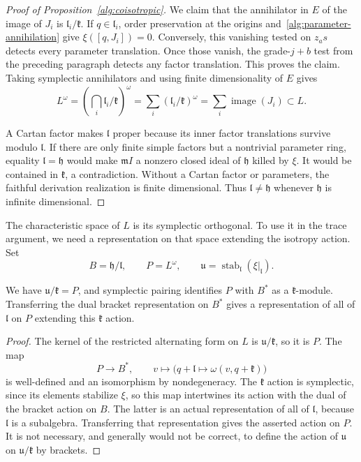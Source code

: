 \begin{proof}[Proof of Proposition~\ref{alg:coisotropic}]
We claim that the annihilator in $E$ of the image of $J_i$ is
$\mathfrak l_i/\mathfrak k$. If $q\in\mathfrak l_i$, order
preservation at the origins and~\eqref{alg:parameter-annihilation}
give $\xi([q,J_i])=0$. Conversely, this vanishing tested on
$z_a s$ detects every parameter translation. Once those vanish,
the grade-$j+b$ test from the preceding paragraph detects any factor
translation. This proves the claim. Taking symplectic annihilators
and using finite dimensionality of $E$ gives
\[
 L^\omega
 =\left(\bigcap_i\mathfrak l_i/\mathfrak k\right)^\omega
 =\sum_i (\mathfrak l_i/\mathfrak k)^\omega
 =\sum_i\operatorname{image}(J_i)\subset L.
\]

A Cartan factor makes $\mathfrak l$ proper because its inner factor
translations survive modulo $\mathfrak l$. If there are only finite
simple factors but a nontrivial parameter ring, equality
$\mathfrak l=\mathfrak h$ would make $\mathfrak m I$ a nonzero
closed ideal of $\mathfrak h$ killed by $\xi$. It would be
contained in $\mathfrak k$, a contradiction. Without a Cartan
factor or parameters, the faithful derivation realization is finite
dimensional. Thus $\mathfrak l\ne\mathfrak h$ whenever $\mathfrak h$
is infinite dimensional.

\end{proof}

The characteristic space of $L$ is its symplectic orthogonal. To use it
in the trace argument, we need a representation on that space extending
the isotropy action. Set
\begin{equation}
 B=\mathfrak h/\mathfrak l,
 \qquad P=L^\omega,
 \qquad
 \mathfrak u=\operatorname{stab}_{\mathfrak l}(\xi|_{\mathfrak l}).
 \label{alg:base-characteristic}
\end{equation}

\begin{lemma}
\label{alg:characteristic-representation}
We have $\mathfrak u/\mathfrak k=P$, and symplectic pairing identifies
$P$ with $B^*$ as a $\mathfrak k$-module. Transferring the dual bracket
representation on $B^*$ gives a representation of all of $\mathfrak l$
on $P$ extending this $\mathfrak k$ action.
\end{lemma}

\begin{proof}
The kernel of the restricted alternating
form on $L$ is $\mathfrak u/\mathfrak k$, so it is $P$.
The map
\[
 P\longrightarrow B^*,\qquad
 v\longmapsto\bigl(q+\mathfrak l\longmapsto
 \omega(v,q+\mathfrak k)\bigr)
\]
is well-defined and an isomorphism by nondegeneracy. The
$\mathfrak k$ action is symplectic, since its elements stabilize
$\xi$, so this map intertwines its action with the dual of the
bracket action on $B$. The latter is an actual representation of
all of $\mathfrak l$, because $\mathfrak l$ is a subalgebra.
Transferring that representation gives the asserted action on $P$.
It is not necessary, and generally would not be correct, to define
the action of $\mathfrak u$ on $\mathfrak u/\mathfrak k$ by
brackets.
\end{proof}


